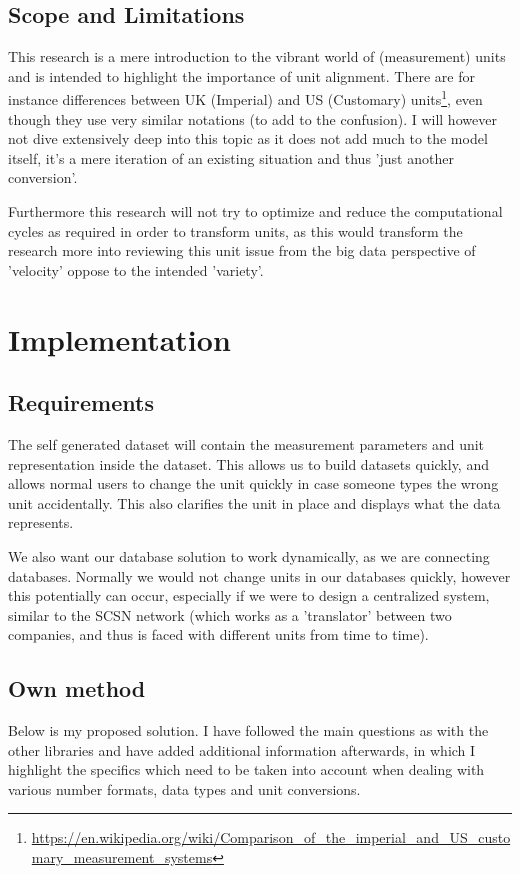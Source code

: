 \documentclass[sigchi, nonacm]{acmart}
\begin{document}
\subsection{Scope and Limitations}
This research is a mere introduction to the vibrant world of (measurement) units and is intended to highlight the importance of unit alignment.
There are for instance differences between UK (Imperial) and US (Customary) units\footnote{\raggedright\url{https://en.wikipedia.org/wiki/Comparison_of_the_imperial_and_US_customary_measurement_systems}}, even though they use very similar notations (to add to the confusion). I will however not dive extensively deep into this topic as it does not add much to the model itself, it's a mere iteration of an existing situation and thus 'just another conversion'.

Furthermore this research will not try to optimize and reduce the computational cycles as required in order to transform units, as this would transform the research more into reviewing this unit issue from the big data perspective of 'velocity' oppose to the intended 'variety'.


\section{Implementation}

\subsection{Requirements}
The self generated dataset will contain the measurement parameters and unit representation inside the dataset. This allows us to build datasets quickly, and allows normal users to change the unit quickly in case someone types the wrong unit accidentally. This also clarifies the unit in place and displays what the data represents.

We also want our database solution to work dynamically, as we are connecting databases. Normally we would not change units in our databases quickly, however this potentially can occur, especially if we were to design a centralized system, similar to the SCSN network (which works as a 'translator' between two companies, and thus is faced with different units from time to time). 


\subsection{Own method}
Below is my proposed solution. I have followed the main questions as with the other libraries and have added additional information afterwards, in which I highlight the specifics which need to be taken into account when dealing with various number formats, data types and unit conversions.
\end{document}
